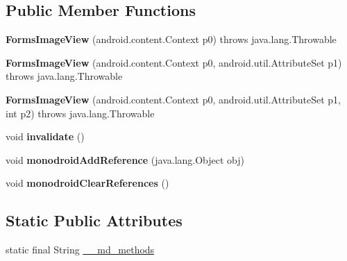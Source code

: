 \subsection*{Public Member Functions}
\begin{DoxyCompactItemize}
\item 
\mbox{\label{classmd5b60ffeb829f638581ab2bb9b1a7f4f3f_1_1FormsImageView_aee489db3f6d7a8dfa9800139a04eaeda}} 
{\bfseries Forms\+Image\+View} (android.\+content.\+Context p0)  throws java.\+lang.\+Throwable 	
\item 
\mbox{\label{classmd5b60ffeb829f638581ab2bb9b1a7f4f3f_1_1FormsImageView_a8ba0beff3d66206db1bb62532722d902}} 
{\bfseries Forms\+Image\+View} (android.\+content.\+Context p0, android.\+util.\+Attribute\+Set p1)  throws java.\+lang.\+Throwable 	
\item 
\mbox{\label{classmd5b60ffeb829f638581ab2bb9b1a7f4f3f_1_1FormsImageView_a65c516e6939a16b2841dc673bd36a971}} 
{\bfseries Forms\+Image\+View} (android.\+content.\+Context p0, android.\+util.\+Attribute\+Set p1, int p2)  throws java.\+lang.\+Throwable 	
\item 
\mbox{\label{classmd5b60ffeb829f638581ab2bb9b1a7f4f3f_1_1FormsImageView_ae6e31fe48b36ca1c798beed0dae7f507}} 
void {\bfseries invalidate} ()
\item 
\mbox{\label{classmd5b60ffeb829f638581ab2bb9b1a7f4f3f_1_1FormsImageView_a80b45cf11c7131a04bd92ebaebbc6a12}} 
void {\bfseries monodroid\+Add\+Reference} (java.\+lang.\+Object obj)
\item 
\mbox{\label{classmd5b60ffeb829f638581ab2bb9b1a7f4f3f_1_1FormsImageView_a2801900ce9e0aca76fb2360c2830ecba}} 
void {\bfseries monodroid\+Clear\+References} ()
\end{DoxyCompactItemize}
\subsection*{Static Public Attributes}
\begin{DoxyCompactItemize}
\item 
static final String \hyperlink{classmd5b60ffeb829f638581ab2bb9b1a7f4f3f_1_1FormsImageView_a25caf4e2fd079c6fac24434fed5d06d0}{\+\_\+\+\_\+md\+\_\+methods}
\end{DoxyCompactItemize}
